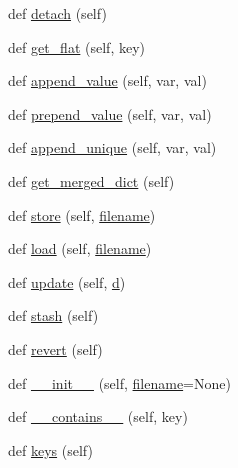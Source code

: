 \begin{DoxyCompactItemize}
\item 
def \hyperlink{classwaflib_1_1_config_set_1_1_config_set_a814d9657a1a328934c2a6e8e47b6d143}{detach} (self)
\item 
def \hyperlink{classwaflib_1_1_config_set_1_1_config_set_a14b5ef92c4f34cd6edc984fb27fe734f}{get\+\_\+flat} (self, key)
\item 
def \hyperlink{classwaflib_1_1_config_set_1_1_config_set_aa595ce4b9065c7577e554654c1f85f38}{append\+\_\+value} (self, var, val)
\item 
def \hyperlink{classwaflib_1_1_config_set_1_1_config_set_a391d63935edf6ac0e33f82924d188340}{prepend\+\_\+value} (self, var, val)
\item 
def \hyperlink{classwaflib_1_1_config_set_1_1_config_set_add15aa09417ce98bc72232370e62ecc5}{append\+\_\+unique} (self, var, val)
\item 
def \hyperlink{classwaflib_1_1_config_set_1_1_config_set_a31bcce8329d5b407efd49a719ceb7656}{get\+\_\+merged\+\_\+dict} (self)
\item 
def \hyperlink{classwaflib_1_1_config_set_1_1_config_set_a40cccbc7de2812a306847ee5fed9e546}{store} (self, \hyperlink{test__portburn_8cpp_a7efa5e9c7494c7d4586359300221aa5d}{filename})
\item 
def \hyperlink{classwaflib_1_1_config_set_1_1_config_set_aa199c23836c9459d17ecd85a6cd08297}{load} (self, \hyperlink{test__portburn_8cpp_a7efa5e9c7494c7d4586359300221aa5d}{filename})
\item 
def \hyperlink{classwaflib_1_1_config_set_1_1_config_set_a298717d62f84c251b97ee02c7c70cb92}{update} (self, \hyperlink{poly-fir_8h_a2530554172d8629149ec56816eeaa947}{d})
\item 
def \hyperlink{classwaflib_1_1_config_set_1_1_config_set_a9f99d3620bcd107a604135ee4e6efb96}{stash} (self)
\item 
def \hyperlink{classwaflib_1_1_config_set_1_1_config_set_a95b43d10b5c41e35677afb969d03d6bd}{revert} (self)
\item 
def \hyperlink{classwaflib_1_1_config_set_1_1_config_set_a9592d030b3ece10a3cc85e76c6d4d586}{\+\_\+\+\_\+init\+\_\+\+\_\+} (self, \hyperlink{test__portburn_8cpp_a7efa5e9c7494c7d4586359300221aa5d}{filename}=None)
\item 
def \hyperlink{classwaflib_1_1_config_set_1_1_config_set_ad599ed7bbada48771389b986e42137d6}{\+\_\+\+\_\+contains\+\_\+\+\_\+} (self, key)
\item 
def \hyperlink{classwaflib_1_1_config_set_1_1_config_set_a73dc4acb24e0408d47bb9604ab429fbe}{keys} (self)
\item 

\end{DoxyCompactItemize}
